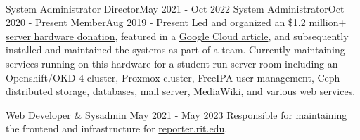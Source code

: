 \vspace{1.5pt} %


\cvtag{\LaTeX}
\medskip
\\

\vspace{6pt} %

    {System Administrator Director}{May 2021 - Oct 2022}
    {System Administrator}{Oct 2020 - Present}
    {Member}{Aug 2019 - Present}
    {Led and organized an \href{https://www.rit.edu/news/wayfair-gifts-850000-servers-rits-computer-science-house}{\$1.2 million+ server hardware donation}, featured in a \href{https://cloud.google.com/blog/transform/wayfair-server-donation-mass-open-cloud-rit-student-innovation-johonnot}{Google Cloud article}, and subsequently installed and maintained the systems as part of a team. Currently maintaining services running on this hardware for a student-run server room including an Openshift/OKD 4 cluster, Proxmox cluster, FreeIPA user management, Ceph distributed storage, databases, mail server, MediaWiki, and various web services.} 

    {Web Developer \& Sysadmin} {May 2021 - May 2023}
    {Responsible for maintaining the frontend and infrastructure for \href{https://reporter.rit.edu}{reporter.rit.edu}.}